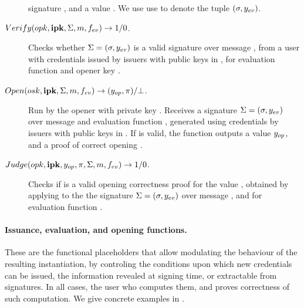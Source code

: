 \begin{description}
  signature \sig, and a value \yeval. We use use \Sig to denote the
  tuple $(\sigma,y_{ev})$.
\item[$Verify(opk,\mathbf{ipk},\Sigma,m,f_{ev}) \rightarrow 1/0$.]
  Checks whether $\Sigma = (\sigma,y_{ev})$ is a valid signature
  over message \msg, from a user with credentials issued by issuers with public
  keys in \sipk, for evaluation function \feval and opener key \opk.
\item[$Open(osk,\mathbf{ipk},\Sigma,m,f_{ev}) \rightarrow
  (y_{op},\pi)/\bot$.]
  Run by the opener with private key \osk. Receives a signature $\Sigma=
  (\sigma,y_{ev})$ over message \msg and evaluation function \feval,
  generated using credentials by issuers with public keys in \sipk.
  If \Sig is valid, the function outputs a value $y_{op}$, and a proof of
  correct opening \iproof.
\item[$Judge(opk,\mathbf{ipk},y_{op},\pi,\Sigma,m,f_{ev}) \rightarrow 1/0$.] %
  Checks if \iproof is a valid opening correctness proof for the value \yinsp,
  obtained by applying \Open to the the signature $\Sigma = (\sigma,y_{ev})$
  over message \msg, and for evaluation function \feval. 
\end{description}

\paragraph{Issuance, evaluation, and opening functions.} %
These are the functional placeholders that allow modulating the behaviour of the
resulting instantiation, by controling the conditions upon which new credentials
can be issued, the information revealed at signing time, or extractable from
signatures. In all cases, the user who computes them, and proves correctness of
such computation. We give concrete examples in .

